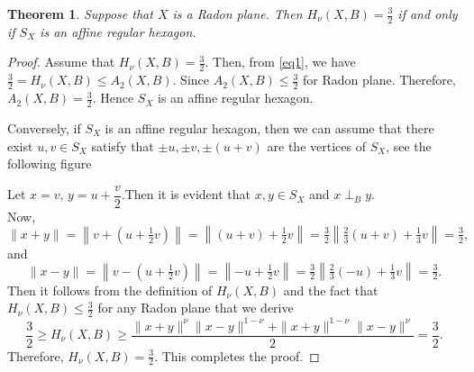 \documentclass[preprint,12pt]{elsarticle}
\newtheorem{theorem}{Theorem}[section]
\numberwithin{equation}{section}
\begin{document}
\begin{theorem}
Suppose that $X$ is a Radon plane. Then  $H_\nu(X,B)=\frac{3}{2}$ if and only if $S_X$ is an affine regular hexagon.
\end{theorem}
\begin{proof}
Assume that  $H_\nu(X,B)=\frac{3}{2}$. Then, from \eqref{eq1}, we have $\frac{3}{2}=H_\nu(X,B)\leq A_2(X,B)$. Since $A_2(X,B)\leq \frac{3}{2}$ for Radon plane. Therefore, $A_2(X,B)=\frac{3}{2}$.
Hence $S_X$ is an affine regular hexagon.

Conversely, if $S_X$ is an affine regular hexagon, then we can assume that there exist
$ u,v \in S_X$ satisfy that $\pm u, \pm v, \pm (u + v)$ are the vertices of $S_X$, see the following figure\\
\begin{center}
\end{center}
 Let $x =v$, $y = u+\dfrac{v}{2}$.Then it is evident that $x,y \in S_X$ and $x\perp_B y$.\\
 Now,
\[
\|x + y\| = \left\| v + \left( u + \tfrac{1}{2}v \right) \right\| 
= \left\| (u + v) + \tfrac{1}{2}v \right\| 
= \tfrac{3}{2} \left\| \tfrac{2}{3}(u + v) + \tfrac{1}{3}v \right\| 
= \tfrac{3}{2},
\]
and
\[
\|x - y\| = \left\| v - \left( u + \tfrac{1}{2}v \right) \right\| 
= \left\| -u + \tfrac{1}{2}v \right\| 
= \tfrac{3}{2} \left\| \tfrac{2}{3}(-u) + \tfrac{1}{3}v \right\| 
= \tfrac{3}{2}.
\]
\noindent Then it follows from the definition of $H_\nu(X,B)$ and the fact that 
$H_\nu(X,B)\leq \frac{3}{2}$ for any Radon plane that we derive
\[
\dfrac{3}{2}\geq H_\nu(X,B) \geq \frac{\|x+y\|^{\nu}\|x-y\|^{1-\nu} + \|x+y\|^{1-\nu}\|x-y\|^{\nu}}{2}=\dfrac{3}{2}.
\]
Therefore, $H_\nu(X,B)= \frac{3}{2}$.
This completes the proof.
\end{proof}
\end{document}
